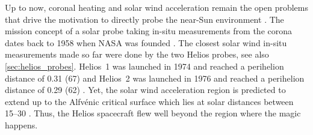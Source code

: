 Up to now, coronal heating and solar wind acceleration remain the open problems that drive the motivation to directly probe the near-Sun environment \citep{McComas2007,Fox2015}. The mission concept of a solar probe taking in-situ measurements from the corona dates back to 1958 when NASA was founded \citep{McComas200807}. The closest solar wind in-situ measurements made so far were done by the two Helios probes, see also \autoref{sec:helios_probes}. Helios~1 was launched in 1974 and reached a perihelion distance of \SI{0.31}{\au} (\SI{67}{\Rs}) and Helios~2 was launched in 1976 and reached a perihelion distance of \SI{0.29}{\au} (\SI{62}{\Rs}) \citep{Rosenbauer1977}. Yet, the solar wind acceleration region is predicted to extend up to the Alfvénic critical surface which lies at solar distances between \SIrange{15}{30}{\Rs} \citep{Katsikas2010,Goelzer2014}. Thus, the Helios spacecraft flew well beyond the region where the magic happens.

